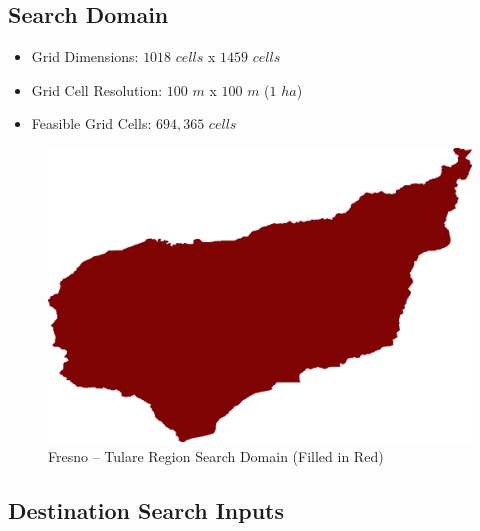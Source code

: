     \subsection{Search Domain}
    
    \begin{itemize}
      \setlength{\itemsep}{0cm}
      \setlength{\parskip}{0cm}
        \item Grid Dimensions: $1018$ $cells$ x $1459$ $cells$
        \item Grid Cell Resolution: $100$ $m$ x $100$ $m$ ($1$ $ha$)
        \item Feasible Grid Cells: $694,365$ $cells$
    \end{itemize}
    
        \begin{figure}[!h]
            \begin{center}
            \includegraphics[width=5.5in]{figures/Fresno_SearchDomain.png}   
            \caption{Fresno -- Tulare Region Search Domain (Filled in Red)}
            \label{fig:Fdomain}
            \end{center}
        \end{figure}
        
    \subsection{Destination Search Inputs}
    
